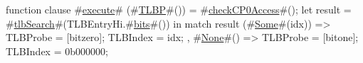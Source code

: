 function clause #\hyperref[zexecute]{execute}# (#\hyperref[zTLBP]{TLBP}#()) = {
  #\hyperref[zcheckCPzeroAccess]{checkCP0Access}#();
  let result = #\hyperref[ztlbSearch]{tlbSearch}#(TLBEntryHi.#\hyperref[zbits]{bits}#()) in
  match result {
    (#\hyperref[zSome]{Some}#(idx))  => {
      TLBProbe = [bitzero];
      TLBIndex = idx;
    },
    #\hyperref[zNone]{None}#()  => {
      TLBProbe = [bitone];
      TLBIndex = 0b000000;
    }
  }
}
